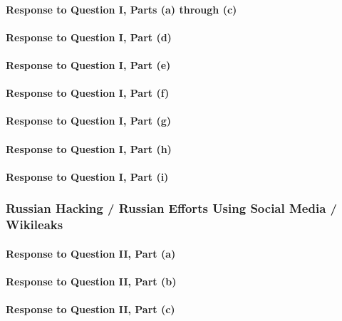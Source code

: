 \paragraph{Response to Question I, Parts (a) through (c)}

\paragraph{Response to Question I, Part (d)}

\paragraph{Response to Question I, Part (e)}

\paragraph{Response to Question I, Part (f)}

\paragraph{Response to Question I, Part (g)}

\paragraph{Response to Question I, Part (h)}

\paragraph{Response to Question I, Part (i)}

\subsubsection{Russian Hacking / Russian Efforts Using Social Media / Wikileaks}

\paragraph{Response to Question II, Part (a)}

\paragraph{Response to Question II, Part (b)}

\paragraph{Response to Question II, Part (c)}

